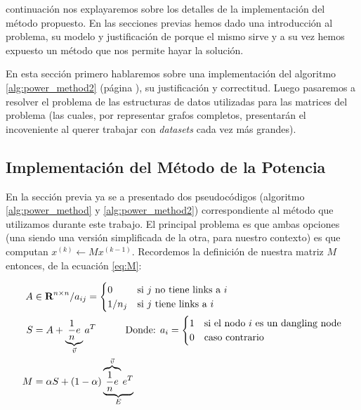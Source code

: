 \par {} continuaci\'on nos explayaremos sobre los detalles de la
implementaci\'on del m\'etodo propuesto. En las secciones previas hemos dado una
introducci\'on al problema, su modelo y justificaci\'on de porque el mismo sirve
y a su vez hemos expuesto un m\'etodo que nos permite hayar la soluci\'on.

\par En esta secci\'on primero hablaremos sobre una implementaci\'on del
algoritmo \ref{alg:power_method2} (p\'agina \pageref{alg:power_method2}), su
justificaci\'on y correctitud. Luego pasaremos a resolver el problema de las
estructuras de datos utilizadas para las matrices del problema (las cuales, por
representar grafos completos, presentar\'an el incoveniente al querer trabajar
con \emph{datasets} cada vez m\'as grandes).

\subsection{Implementaci\'on del M\'etodo de la Potencia}
\par En la secci\'on previa ya se a presentado dos pseudoc\'odigos (algoritmo
\ref{alg:power_method} y \ref{alg:power_method2}) correspondiente al m\'etodo
que utilizamos durante este trabajo. El principal problema es que ambas opciones
(una siendo una versi\'on simplificada de la otra, para nuestro contexto) es que
computan $x^{(k)} \gets Mx^{(k-1)}$. Recordemos la definici\'on de nuestra
matriz $M$ entonces, de la ecuaci\'on \ref{eq:M}:

\begin{align}
    A &\in\real^{n\times n} / a_{ij} =
        \begin{cases}
            0       &\text{si $j$ no tiene links a $i$}\\
            1/n_j   &\text{si $j$ tiene links a $i$}
        \end{cases}\label{eq:A2}\\
    S &= A + \underbrace{\dfrac{1}{n}e}_{\vec{v}}a^T \quad\quad\quad
        \text{Donde: } a_i =
        \begin{cases}
            1 &\text{si el nodo $i$ es un dangling node}\\
            0 &\text{caso contrario}
        \end{cases}\label{eq:S2}\\
    M &= \alpha S + (1-\alpha)\underbrace{\overbrace{\dfrac{1}{n}e}^{\vec{v}}e^T}_E
    \label{eq:M2}
\end{align}

